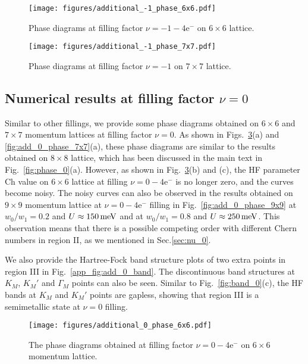 \documentclass[prb,aps,nofootinbib,amssymb,twocolumn,superscriptaddress,10pt]{revtex4-2}
\begin{document}
\begin{widetext}
\begin{figure}
    \centering
    \texttt{[image: figures/additional\_-1\_phase\_6x6.pdf]}
    \caption{Phase diagrams at filling factor $\nu=-1 - 4\mathrm{e}^-$ on $6\times 6$ lattice.}
    \label{fig:add_-1_6x6_phase}
\end{figure}

\begin{figure}
    \centering
    \texttt{[image: figures/additional\_-1\_phase\_7x7.pdf]}
    \caption{Phase diagrams at filling factor $\nu=-1$ on $7\times 7$ lattice.}
    \label{fig:add_-1_7x7_phase}
\end{figure}

\subsection{Numerical results at filling factor \texorpdfstring{$\nu=0$}{nu=0}}\label{app_subsec:0}

Similar to other fillings, we provide some phase diagrams obtained on $6\times 6$ and $7\times 7$ momentum lattices at filling factor $\nu=0$. As shown in Figs.~\ref{fig:add_0_phase_6x6}(a) and \ref{fig:add_0_phase_7x7}(a), these phase diagrams are similar to the results obtained on $8\times 8$ lattice, which has been discussed in the main text in Fig.~\ref{fig:phase_0}(a). However, as shown in Fig.~\ref{fig:add_0_phase_6x6}(b) and (c), the HF parameter $\mathrm{Ch}$ value on $6\times 6$ lattice at filling $\nu=0-4\mathrm{e}^-$ is no longer zero, and the curves become noisy. The noisy curves can also be observed in the results obtained on $9\times 9$ momentum lattice at $\nu=0-4\mathrm{e}^-$ filling in Fig.~\ref{fig:add_0_phase_9x9} at $w_0/w_1=0.2$ and $U\approx 150\,\rm meV$ and at $w_0/w_1 = 0.8$ and $U \approx 250\,\rm meV$. This observation means that there is a possible competing order with different Chern numbers in region II, as we mentioned in Sec.\ref{sec:nu_0}.

We also provide the Hartree-Fock band structure plots of two extra points in region III in Fig.~\ref{app_fig:add_0_band}. The discontinuous band structures at $K_M$, $K_M'$ and $\Gamma_M$ points can also be seen. Similar to Fig.~\ref{fig:band_0}(c), the HF bands at $K_M$ and $K_M'$ points are gapless, showing that region III is a semimetallic state at $\nu=0$ filling.

\begin{figure}
    \centering
    \texttt{[image: figures/additional\_0\_phase\_6x6.pdf]}
    \caption{The phase diagrams obtained at filling factor $\nu=0-4\mathrm{e}^-$ on $6\times 6$ momentum lattice.}
    \label{fig:add_0_phase_6x6}
\end{figure}


\end{widetext}
\end{document}
